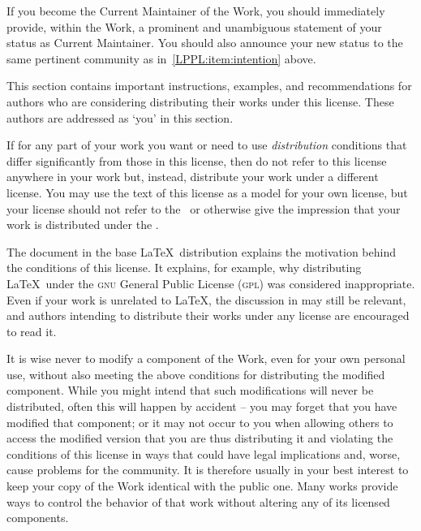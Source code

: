 \begin{LPPLicense}
  If you become the Current Maintainer of the Work, you should
  immediately provide, within the Work, a prominent and unambiguous
  statement of your status as Current Maintainer.  You should also
  announce your new status to the same pertinent community as
  in~\ref{LPPL:item:intention} above.

  \label{LPPL:Distribute}

  This section contains important instructions, examples, and
  recommendations for authors who are considering distributing their
  works under this license.  These authors are addressed as `you' in
  this section.

  \label{LPPL:Choosing}

  If for any part of your work you want or need to use
  \emph{distribution} conditions that differ significantly from those
  in this license, then do not refer to this license anywhere in your
  work but, instead, distribute your work under a different license.
  You may use the text of this license as a model for your own
  license, but your license should not refer to the \LPPL\ or
  otherwise give the impression that your work is distributed under
  the \LPPL.

  The document  in the base \LaTeX\ distribution
  explains the motivation behind the conditions of this license.  It
  explains, for example, why distributing \LaTeX\ under the
  \textsc{gnu} General Public License (\textsc{gpl}) was considered
  inappropriate.  Even if your work is unrelated to \LaTeX, the
  discussion in  may still be relevant, and authors
  intending to distribute their works under any license are encouraged
  to read it.

  \label{LPPL:WithoutDistribution}

  It is wise never to modify a component of the Work, even for your
  own personal use, without also meeting the above conditions for
  distributing the modified component.  While you might intend that
  such modifications will never be distributed, often this will happen
  by accident -- you may forget that you have modified that component;
  or it may not occur to you when allowing others to access the
  modified version that you are thus distributing it and violating the
  conditions of this license in ways that could have legal
  implications and, worse, cause problems for the community.  It is
  therefore usually in your best interest to keep your copy of the
  Work identical with the public one.  Many works provide ways to
  control the behavior of that work without altering any of its
  licensed components.


\end{LPPLicense}
